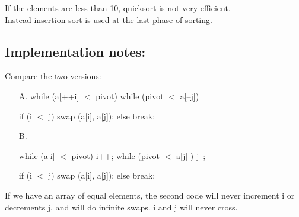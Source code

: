 \documentclass{article}
\begin{document}
	If the elements are less than 10, quicksort is not very efficient. \\
	Instead insertion sort is used at the last phase of sorting.
	
	\subsection{Implementation notes:}
	Compare the two versions:
	\begin{enumerate}
		
		
		\item[A.] 
		while (a[++i] $<$ pivot) {}
		while (pivot $<$ a[--j]) {}
		
		if (i $<$ j) swap (a[i], a[j]);
		else break;
		\item[B.] \
		
		while (a[i] $<$ pivot) {i++;}
		while (pivot $<$ a[j] ) {j--;}
		
		if (i $<$ j) swap (a[i], a[j]);
		else break;
	\end{enumerate}
	If we have an array of equal elements, the second code will never increment i or decrements j, 
	and will do infinite swaps. i and j will never cross.
	
	
\end{document}
